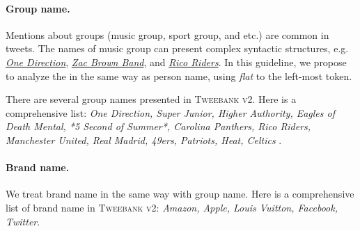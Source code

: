 \documentclass[11pt,a4paper]{article}
\begin{document}
\paragraph{Group name.}
Mentions about groups (music group, sport group, and etc.) are common in tweets.
The names of music group can present complex syntactic structures,
e.g. \underline{\textit{One Direction}}, \underline{\textit{Zac Brown Band}},
and \underline{\textit{Rico Riders}}.
In this guideline, we propose to analyze the in the same way as
person name, using \textit{flat} to the left-most token.

There are several group names presented in \textsc{Tweebank v2}. Here is a comprehensive list:
\textit{One Direction, Super Junior, 
	Higher Authority,
	Eagles of Death Mental, 
	*5 Second of Summer*,
	Carolina Panthers, Rico Riders, Manchester United, Real Madrid,
	49ers, Patriots, Heat, Celtics
}.

\paragraph{Brand name.}
We treat brand name in the same way with group name.
Here is a comprehensive list of brand name in \textsc{Tweebank v2}:
\textit{Amazon, Apple, Louis Vuitton, Facebook, Twitter}.
\end{document}
